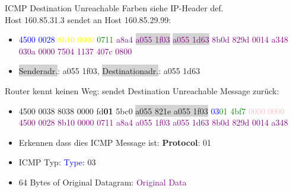 \begin{example2}{ICMP Destination Unreachable} Farben siehe IP-Header def.\\
    Host 160.85.31.3 sendet an Host 160.85.29.99:
    \begin{itemize}
        \item \textcolor{blue}{4500 0028} \textcolor{yellow}{8b10 0000} \textcolor{green}{0711} \textcolor{purple}{a8a4 \colorbox{lightgrey}{a055 1f03} \colorbox{lightgrey}{a055 1d63} 8b0d 829d 0014 a348 030a 0000 7504 1137 407c 0800}
        \item \colorbox{lightgrey}{Senderadr.}: a055 1f03, \colorbox{lightgrey}{Destinationadr.}: a055 1d63
    \end{itemize}
    Router kennt keinen Weg: sendet Destination Unreachable Message zurück:
    \begin{itemize}
        \item 4500 0038 8038 0000 fd\textbf{01} 5bc0 \colorbox{lightgrey}{a055 821e a055 1f03} \textcolor{blue}{03}\textcolor{green}{01 4bf7} \textcolor{pink}{0000 0000} \textcolor{purple}{4500 0028 8b10 0000 0711 a8a4 a055 1f03 a055 1d63 8b0d 829d 0014 a348}
        \item Erkennen dass dies ICMP Message ist: \textbf{Protocol}: 01
        \item ICMP Typ: \textcolor{blue}{Type}: 03
        \item 64 Bytes of Original Datagram: \textcolor{purple}{Original Data}
    \end{itemize}
\end{example2}













